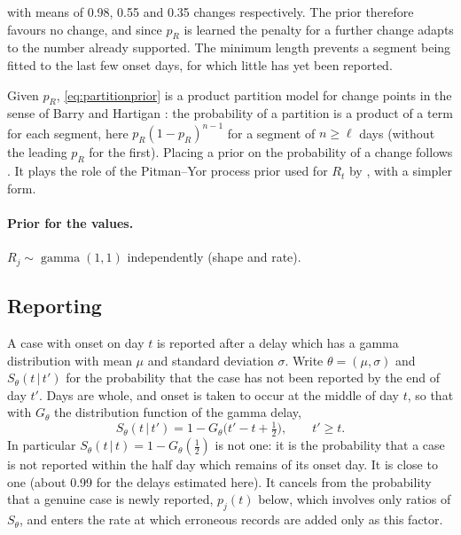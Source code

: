 \documentclass[11pt,a4paper]{article}
\newcommand{\given}{\,|\,}
\begin{document}
\noindent with means of 0.98, 0.55 and 0.35 changes respectively. The prior therefore favours no change,
and since $p_R$ is learned the penalty for a further change adapts to the
number already supported. The minimum length
prevents a segment being fitted to the last few onset days, for which little
has yet been reported.

Given $p_R$, \eqref{eq:partitionprior} is a product partition model for
change points in the sense of Barry and Hartigan \cite{barry1992}: the
probability of a partition is a product of a term for each segment, here
$p_R(1-p_R)^{n-1}$ for a segment of $n\ge\ell$ days (without the leading
$p_R$ for the first). Placing a prior on the probability of a change follows
\cite{barry1993}. It plays the role of the Pitman--Yor process prior used for
$R_t$ by \cite{creswell2022}, with a simpler form.

\paragraph{Prior for the values.} $R_j\sim\operatorname{gamma}(1,1)$
independently (shape and rate).

\subsection{Reporting}

A case with onset on day $t$ is reported after a delay which has a gamma
distribution with mean $\mu$ and standard deviation $\sigma$. Write
$\theta=(\mu,\sigma)$ and $S_\theta(t\given t')$ for the probability that the
case has not been reported by the end of day $t'$. Days are whole, and onset
is taken to occur at the middle of day $t$, so that with $G_\theta$ the
distribution function of the gamma delay,
\begin{equation}\label{eq:S}
S_\theta(t\given t')=1-G_\theta\bigl(t'-t+\tfrac12\bigr),\qquad t'\ge t.
\end{equation}
In particular $S_\theta(t\given t)=1-G_\theta(\tfrac12)$ is not one: it is
the probability that a case is not reported within the half day which remains
of its onset day. It is close to one (about 0.99 for the delays estimated
here). It cancels from the probability that a genuine case is newly reported,
$p_j(t)$ below, which involves only ratios of $S_\theta$, and enters the rate
at which erroneous records are added only as this factor.
\end{document}
